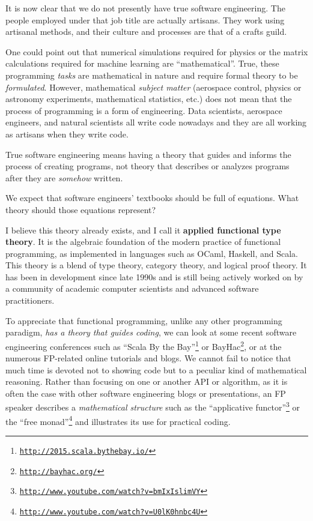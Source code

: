 It is now clear that we do not presently have true software engineering.
The people employed under that job title are actually artisans. They
work using artisanal methods, and their culture and processes are
that of a crafts guild.

One could point out that numerical simulations required for physics
or the matrix calculations required for machine learning are ``mathematical''.
True, these programming \emph{tasks} are mathematical in nature and
require formal theory to be \emph{formulated}. However, mathematical
\emph{subject matter} (aerospace control, physics or astronomy experiments,
mathematical statistics, etc.) does not mean that the process of programming
is a form of engineering. Data scientists, aerospace engineers, and
natural scientists all write code nowadays \textemdash{} and they
are all working as artisans when they write code.

True software engineering means having a theory that guides and informs
the process of creating programs, \textemdash{} not theory that describes
or analyzes programs after they are \emph{somehow} written.

We expect that software engineers' textbooks should be full of equations.
What theory should those equations represent?

I believe this theory already exists, and I call it \textbf{applied
functional type theory}. It
is the algebraic foundation of the modern practice of functional programming,
as implemented in languages such as OCaml, Haskell, and Scala. This
theory is a blend of type theory, category theory, and logical proof
theory. It has been in development since late 1990s and is still being
actively worked on by a community of academic computer scientists
and advanced software practitioners.

To appreciate that functional programming, unlike any other programming
paradigm, \emph{has a theory that guides coding}, we can look at some
recent software engineering conferences such as ``Scala By the Bay''\footnote{\texttt{\href{http://2015.scala.bythebay.io/}{http://2015.scala.bythebay.io/}}}
or BayHac\footnote{\texttt{\href{http://bayhac.org/}{http://bayhac.org/}}},
or at the numerous FP-related online tutorials and blogs. We cannot
fail to notice that much time is devoted not to showing code but to
a peculiar kind of mathematical reasoning. Rather than focusing on
one or another API or algorithm, as it is often the case with other
software engineering blogs or presentations, an FP speaker describes
a \emph{mathematical structure} \textemdash{} such as the ``applicative
functor''\footnote{\texttt{\href{http://www.youtube.com/watch?v=bmIxIslimVY}{http://www.youtube.com/watch?v=bmIxIslimVY}}}
or the ``free monad''\footnote{\texttt{\href{http://www.youtube.com/watch?v=U0lK0hnbc4U}{http://www.youtube.com/watch?v=U0lK0hnbc4U}}}
\textemdash{} and illustrates its use for practical coding.

